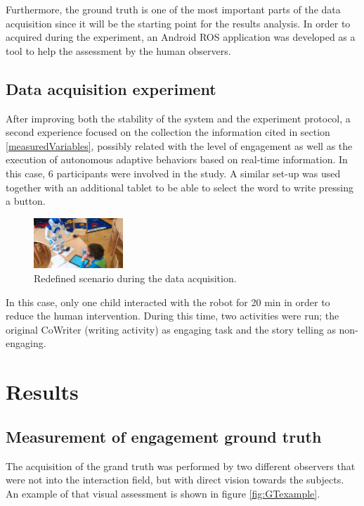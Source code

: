 \documentclass[a4paper, 10pt, conference]{ieeeconf}      %
\begin{document}
Furthermore, the ground truth is one of the most important parts of the data acquisition since it will be the starting point for the results analysis. In order to acquired during the experiment, an Android ROS application was developed as a tool to help the assessment by the human observers. 

\subsection{Data acquisition experiment} \label{sec:experiment} 

After improving both the stability of the system and the experiment protocol, a second experience focused on the collection the information cited in section \ref{measuredVariables}, possibly related with the level of engagement as well as the execution of autonomous adaptive behaviors based on real-time information. In this case, 6 participants were involved in the study. A similar set-up was used together with an additional tablet to be able to select the word to write pressing a button.

\begin{figure}[h!]
        \centering
        \includegraphics[width=0.3\textwidth]{../dissertation/figures/experiment.jpg}
        \caption{Redefined scenario during the data acquisition.}
        \label{fig:experiment}
\end{figure}

In this case, only one child interacted with the robot for 20 min in order to reduce the human intervention. During this time, two activities were run; the original CoWriter (writing activity) as engaging task and the story telling as non-engaging.

\section{Results}

\subsection{Measurement of engagement ground truth}
The acquisition of the grand truth was performed by two different observers that were not into the interaction field, but with direct vision towards the subjects. An example of that visual assessment is shown in figure \ref{fig:GTexample}.
\end{document}
